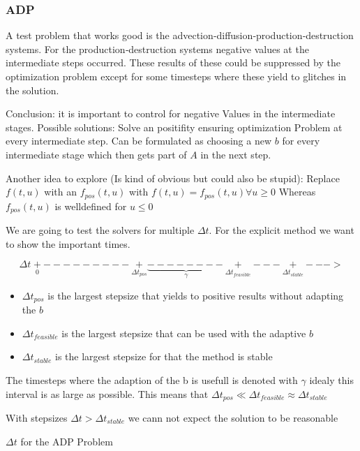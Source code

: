 \documentclass{article}
\begin{document}
\subsubsection{ADP}
A test problem that works good is the advection‐diffusion‐production‐destruction systems. 
For the production‐destruction systems negative values at the intermediate steps occurred. These results of these could be suppressed by the optimization problem  except for some timesteps where these yield to glitches in the solution.

Conclusion: it is important to control for negative Values in the intermediate stages.
Possible solutions: Solve an positifity ensuring optimization Problem at every intermediate step.
Can be formulated as choosing a new $b$ for every intermediate stage which then gets part of $A$ in the next step.

Another idea to explore (Is kind of obvious but could also be stupid): Replace $f(t,u)$ with an $f_{pos}(t,u)$ with 
$f(t,u)=f_{pos}(t,u) \forall u \geq 0 $
Whereas $f_{pos}(t,u)$ is welldefined for $u \leq 0$


We are going to test the solvers for multiple $\Delta t$. For the explicit method we want to show the important times.

$$ \Delta t \; \underset{0}{+}---------\underset{\Delta t_{pos}}{+}\underbrace{--------}_{\gamma}\underset{\Delta t_{feasible}}{+}---\underset{\Delta t_{stable}}{+}--->  $$

\begin{itemize}
\item
$\Delta t_{pos}$ is the largest stepsize that yields to positive results without adapting the $b$

\item
$\Delta t_{feasible}$ is the largest stepsize that can be used with the adaptive $b$

\item
$\Delta t_{stable}$ is the largest stepsize for that the method is stable
\end{itemize}


The timesteps where the adaption of the b is usefull is denoted with $\gamma$ idealy this interval is as large as possible. This means that $\Delta t_{pos} \ll \Delta t_{feasible} \approx \Delta t_{stable}$

With stepsizes $\Delta t > \Delta t_{stable} $ we cann not expect the solution to be reasonable

$\Delta t$ for the ADP Problem 
\end{document}
